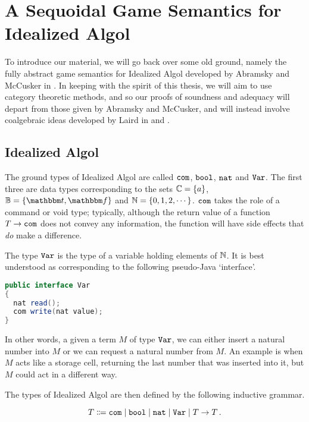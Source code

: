 \chapter{A Sequoidal Game Semantics for Idealized Algol}
\label{ChapGames}

To introduce our material, we will go back over some old ground, namely the fully abstract game semantics for Idealized Algol developed by Abramsky and McCusker in \cite{SamsonGuyIAActive}.  
In keeping with the spirit of this thesis, we will aim to use category theoretic methods, and so our proofs of soundness and adequacy will depart from those given by Abramsky and McCusker, and will instead involve coalgebraic ideas developed by Laird in \cite{laird02} and \cite{LairdCofCommCom}.

\section{Idealized Algol}

The ground types of Idealized Algol are called ${\mathtt{com}}$, ${\mathtt{bool}}$, ${\mathtt{nat}}$ and ${\mathtt{Var}}$.  
The first three are data types corresponding to the sets $\mathbb{C} = \{a\}$, $\bB = \{\true,\false\}$ and $\mathbb{N} = \{0,1,2,\cdots\}$.
${\mathtt{com}}$ takes the role of a command or void type; typically, although the return value of a function $T \to {\mathtt{com}}$ does not convey any information, the function will have side effects that \emph{do} make a difference.

The type ${\mathtt{Var}}$ is the type of a variable holding elements of $\mathbb{N}$.
It is best understood as corresponding to the following pseudo-Java `interface'.

\begin{minipage}{\linewidth}
\begin{lstlisting}[language=Java, morekeywords={nat,com}]
public interface Var
{
  nat read();
  com write(nat value);
}
\end{lstlisting}
\end{minipage}

In other words, a given a term $M$ of type ${\mathtt{Var}}$, we can either insert a natural number into $M$ or we can request a natural number from $M$.  
An example is when $M$ acts like a storage cell, returning the last number that was inserted into it, but $M$ could act in a different way.

The types of Idealized Algol are then defined by the following inductive grammar.

\[
  T \Coloneqq {\mathtt{com}} \mid {\mathtt{bool}} \mid {\mathtt{nat}} \mid {\mathtt{Var}} \mid T \to T\,.
  \]

